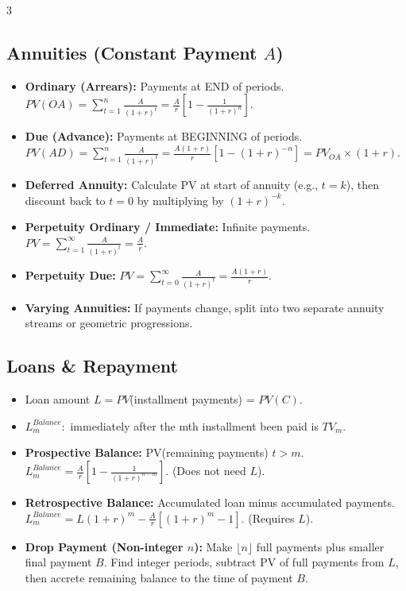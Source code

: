 \documentclass[8pt,a4paper,landscape]{extarticle}
\begin{document}
\begin{multicols*}{3}
    \subsection{Annuities (Constant Payment $A$)}
    \begin{itemize}
        \item \textbf{Ordinary (Arrears):} Payments at END of periods. \\ $PV(OA) = \sum_{t = 1}^{n} \frac{A}{(1 + r)^{t}} = \frac{A}{r}[1 - \frac{1}{(1+r)^{n}}]$.
        \item \textbf{Due (Advance):} Payments at BEGINNING of periods. \\ $PV(AD) = \sum_{t = 1}^{n} \frac{A}{(1 + r)^{t}} = \frac{A(1+r)}{r}[1 - (1+r)^{-n}] = PV_{OA} \times (1+r)$.
        \item \textbf{Deferred Annuity:} Calculate PV at start of annuity (e.g., $t=k$), then discount back to $t=0$ by multiplying by $(1+r)^{-k}$.
        \item \textbf{Perpetuity Ordinary / Immediate:} Infinite payments. \\ $PV = \sum_{t = 1}^{\infty} \frac{A}{(1 + r)^{t}} = \frac{A}{r}$.
        \item \textbf{Perpetuity Due:} $PV = \sum_{t = 0}^{\infty} \frac{A}{(1 + r)^{t}} = \frac{A(1+r)}{r}$.
        \item \textbf{Varying Annuities:} If payments change, split into two separate annuity streams or geometric progressions.
    \end{itemize}

    \subsection{Loans \& Repayment}
    \begin{itemize}
        \item Loan amount $L = PV$(installment payments) = $PV(C)$.
        \item \textbf{$L_m^{Balance}:$} immediately after the mth installment been paid is $TV_m$.
        \item \textbf{Prospective Balance:} PV(remaining payments) $t > m$. \\ $L_m^{Balance} = \frac{A}{r}[1 - \frac{1}{(1+r)^{n-m}}]$. (Does not need $L$).
        \item \textbf{Retrospective Balance:} Accumulated loan minus accumulated payments. \\ $L_m^{Balance} = L(1+r)^m - \frac{A}{r}[(1+r)^m - 1]$. (Requires $L$).
        \item \textbf{Drop Payment (Non-integer $n$):} Make $\lfloor n \rfloor$ full payments plus smaller final payment $B$. Find integer periods, subtract PV of full payments from $L$, then accrete remaining balance to the time of payment $B$.
    \end{itemize}


\end{multicols*}
\end{document}
